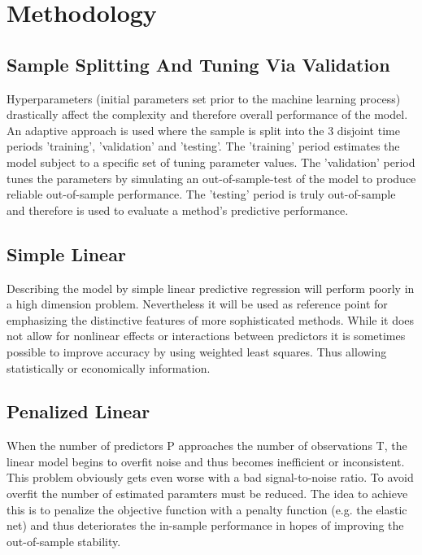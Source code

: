 \documentclass{article}
\begin{document}
\section{Methodology}

\subsection{Sample Splitting And Tuning Via Validation}
	Hyperparameters (initial parameters set prior to the machine learning process)
	drastically affect the complexity and therefore overall performance of the model.
	An adaptive approach is used where the sample is split into the 3 disjoint time periods
	'training', 'validation' and 'testing'. The 'training' period estimates the model
	subject to a specific set of tuning parameter values. The 'validation' period
	tunes the parameters by simulating an out-of-sample-test of the model
	to produce reliable out-of-sample performance. The 'testing' period is truly
	out-of-sample and therefore is used to evaluate a method’s predictive performance.

\subsection{Simple Linear}
	Describing the model by simple linear predictive regression will perform poorly in a high
	dimension problem. Nevertheless it will be used as reference point for emphasizing
	the distinctive features of more sophisticated methods.
	While it does not allow for nonlinear effects or interactions between predictors
	it is sometimes possible to improve accuracy by using weighted least squares.
	Thus allowing statistically or economically information.

\subsection{Penalized Linear}
	When the number of predictors P approaches the number of observations T,
	the linear model begins to overfit noise and thus becomes inefficient or inconsistent.
	This problem obviously gets even worse with a bad signal-to-noise ratio.
	To avoid overfit the number of estimated paramters must be reduced.
	The idea to achieve this is to penalize the objective function with a penalty
	function (e.g. the elastic net) and thus deteriorates the in-sample performance
	in hopes of improving the out-of-sample stability.
\end{document}
